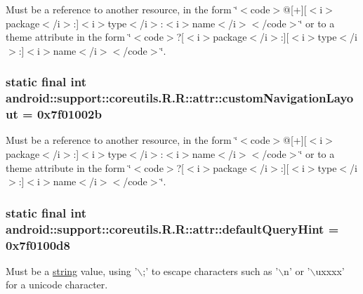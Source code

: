Must be a reference to another resource, in the form \char`\"{}$<$code$>$@\mbox{[}+\mbox{]}\mbox{[}$<$i$>$package$<$/i$>$:\mbox{]}$<$i$>$type$<$/i$>$:$<$i$>$name$<$/i$>$$<$/code$>$\char`\"{} or to a theme attribute in the form \char`\"{}$<$code$>$?\mbox{[}$<$i$>$package$<$/i$>$:\mbox{]}\mbox{[}$<$i$>$type$<$/i$>$:\mbox{]}$<$i$>$name$<$/i$>$$<$/code$>$\char`\"{}. \hypertarget{classandroid_1_1support_1_1coreutils_1_1_r_1_1attr_ec3813e3780a2debe7e4a91da2b97cc8}{
\subsubsection[{customNavigationLayout}]{\setlength{\rightskip}{0pt plus 5cm}static final int android::support::coreutils.R.R::attr::customNavigationLayout = 0x7f01002b}}
\label{classandroid_1_1support_1_1coreutils_1_1_r_1_1attr_ec3813e3780a2debe7e4a91da2b97cc8}


Must be a reference to another resource, in the form \char`\"{}$<$code$>$@\mbox{[}+\mbox{]}\mbox{[}$<$i$>$package$<$/i$>$:\mbox{]}$<$i$>$type$<$/i$>$:$<$i$>$name$<$/i$>$$<$/code$>$\char`\"{} or to a theme attribute in the form \char`\"{}$<$code$>$?\mbox{[}$<$i$>$package$<$/i$>$:\mbox{]}\mbox{[}$<$i$>$type$<$/i$>$:\mbox{]}$<$i$>$name$<$/i$>$$<$/code$>$\char`\"{}. \hypertarget{classandroid_1_1support_1_1coreutils_1_1_r_1_1attr_3ca476fe6f0645e8407dd80e4a7211f6}{
\subsubsection[{defaultQueryHint}]{\setlength{\rightskip}{0pt plus 5cm}static final int android::support::coreutils.R.R::attr::defaultQueryHint = 0x7f0100d8}}
\label{classandroid_1_1support_1_1coreutils_1_1_r_1_1attr_3ca476fe6f0645e8407dd80e4a7211f6}


Must be a \hyperlink{classandroid_1_1support_1_1coreutils_1_1_r_1_1string}{string} value, using '$\backslash$;' to escape characters such as '$\backslash$n' or '$\backslash$uxxxx' for a unicode character. 

